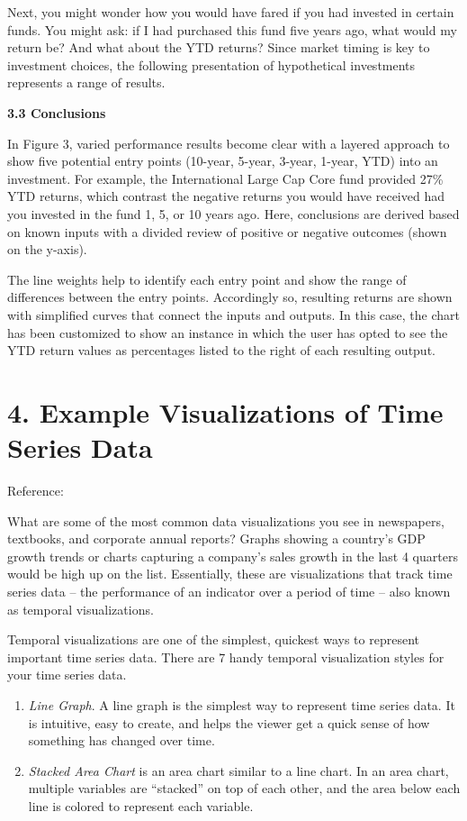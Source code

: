 \documentclass[]{book}
\theoremstyle{definition}
\theoremstyle{definition}
\theoremstyle{definition}
\theoremstyle{remark}
\begin{document}
Next, you might wonder how you would have fared if you had invested in
certain funds. You might ask: if I had purchased this fund five years
ago, what would my return be? And what about the YTD returns? Since
market timing is key to investment choices, the following presentation
of hypothetical investments represents a range of results.

\textbf{3.3 Conclusions}

In Figure 3, varied performance results become clear with a layered
approach to show five potential entry points (10-year, 5-year, 3-year,
1-year, YTD) into an investment. For example, the International Large
Cap Core fund provided 27\% YTD returns, which contrast the negative
returns you would have received had you invested in the fund 1, 5, or 10
years ago. Here, conclusions are derived based on known inputs with a
divided review of positive or negative outcomes (shown on the y-axis).

The line weights help to identify each entry point and show the range of
differences between the entry points. Accordingly so, resulting returns
are shown with simplified curves that connect the inputs and outputs. In
this case, the chart has been customized to show an instance in which
the user has opted to see the YTD return values as percentages listed to
the right of each resulting output.\citep{data_meaning}

\section{4. Example Visualizations of Time Series
Data}\label{example-visualizations-of-time-series-data}

Reference: \citep{aya-time-series}

What are some of the most common data visualizations you see in
newspapers, textbooks, and corporate annual reports? Graphs showing a
country's GDP growth trends or charts capturing a company's sales growth
in the last 4 quarters would be high up on the list. Essentially, these
are visualizations that track time series data -- the performance of an
indicator over a period of time -- also known as temporal
visualizations.

Temporal visualizations are one of the simplest, quickest ways to
represent important time series data. There are 7 handy temporal
visualization styles for your time series data.

\begin{enumerate}
\def\labelenumi{\arabic{enumi}.}
\item
  \emph{Line Graph}. A line graph is the simplest way to represent time
  series data. It is intuitive, easy to create, and helps the viewer get
  a quick sense of how something has changed over time.
\item
  \emph{Stacked Area Chart} is an area chart similar to a line chart. In
  an area chart, multiple variables are ``stacked'' on top of each
  other, and the area below each line is colored to represent each
  variable.
\end{enumerate}
\end{document}
